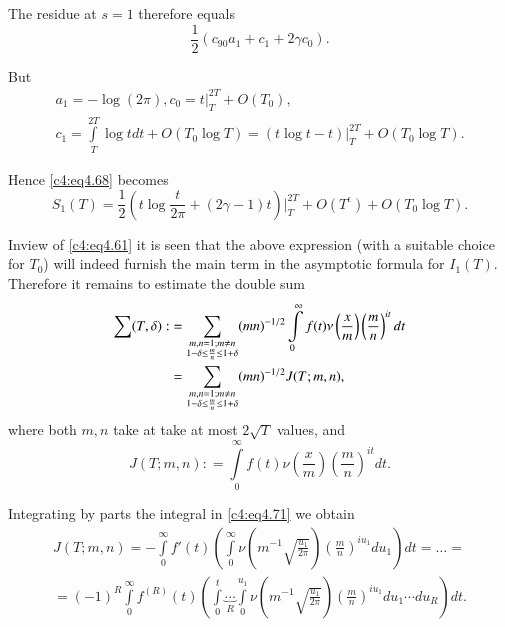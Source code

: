 The residue at $s=1$ therefore equals
$$
\frac{1}{2} \left(c_90 a_1 + c_1 + 2\gamma c_0\right).
$$

But 
\begin{gather*}
a_1 =- \log (2\pi), c_0 = t\bigg|_T^{2T} + O (T_0),\\
c_1 = \int\limits_T^{2T} \log t dt + O(T_0 \log T) = (t \log t-t)
  \bigg|_T^{2T} + O(T_0 \log T).
\end{gather*}

Hence \eqref{c4:eq4.68} becomes
\begin{equation}
  S_1 (T) = \frac{1}{2} \left(t \log \frac{t}{2 \pi} + (2 \gamma -1)t
  \right) \Bigg|_T^{2T} + O(T^\epsilon) + O(T_0 \log T).\label{c4:eq4.69}
\end{equation}

In\pageoriginale view of \eqref{c4:eq4.61} it is seen that the above expression
(with a suitable choice for $T_0$) will indeed furnish the main term
in the asymptotic formula for $I_1 (T)$. Therefore it remains to
estimate the double sum
\begin{align}
  \sum (T, \delta) : & = \sum_{\substack{m, n = 1; m\neq n\\ 1-
    \delta \leq \frac{m}{n} \leq 1+ \delta}} (mn)^{-1/2}
  \int\limits_0^\infty f(t) \nu \left(\frac{x}{m}\right)
  \left(\frac{m}{n}\right)^{it} dt\label{c4:eq4.70}\\
  & = \sum_{\substack{m, n=1; m\neq n\\1- \delta \leq \frac{m}{n} \leq
  1 + \delta}} (mn)^{-1/2} J(T; m, n),\notag
\end{align}
where both $m, n$ take at take at most $2 \sqrt{T}$ values, and 
\begin{equation}
  J(T; m, n): = \int\limits_0^\infty f(t) \nu \left(\frac{x}{m} \right)
  \left(\frac{m}{n} \right)^{it} dt.\label{c4:eq4.71}
\end{equation}

Integrating by parts the integral in \eqref{c4:eq4.71} we obtain 
\begin{multline*}
  J(T; m, n) = - \int\limits_0^\infty f' (t)
  \left(\int\limits_0^\infty \nu \left(m^{-1} \sqrt{\frac{u_1}{2\pi}}
  \right)\left(\frac{m}{n} \right)^{iu_1} du_1 \right) dt  = \ldots
  =\\
  = (-1)^R \int\limits_0^\infty f^{(R)} (t) \left(\int\limits_0^t
  \underbrace{\cdots}_R \int\limits_0^{u_1} \nu \left(m^{-1}
  \sqrt{\frac{u_1}{2\pi}} \right) \left(\frac{m}{n} \right)^{iu_1}
  du_1 \cdots du_R \right)dt.
\end{multline*}


